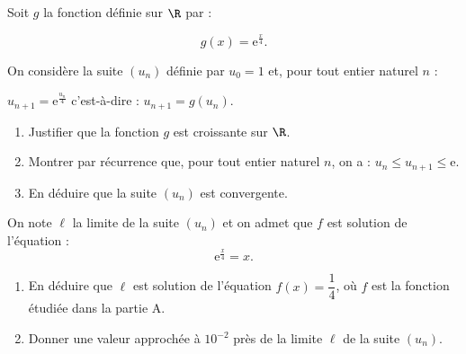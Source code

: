 Soit $g$ la fonction définie sur $\R$ par : 

\[g(x) = \text{e}^{\frac{x}{4}}.\]

On considère la suite $\left(u_n\right)$ définie par $u_0 = 1$ et, pour tout entier naturel $n$ :

$u_{n+1} = \text{e}^{\frac{u_n}{4}}$ c'est-à-dire : $u_{n+1} = g\left(u_n\right)$.

\medskip

\begin{enumerate}
\item Justifier que la fonction $g$ est croissante sur $\R$.
\item Montrer par récurrence que, pour tout entier naturel $n$, on a : $u_n \leqslant  u_{n+1} \leqslant \text{e}$.
\item En déduire que la suite $\left(u_n\right)$ est convergente.
\end{enumerate}

On note $\ell$ la limite de la suite $\left(u_n\right)$ et on admet que $f$ est solution de l'équation : 
\[\text{e}^{\frac{x}{4}} = x.\]

\begin{enumerate}[resume]
\item En déduire que $\ell$ est solution de l'équation $f(x) = \dfrac14$, où $f$ est la fonction étudiée dans
la partie A.
\item Donner une valeur approchée à $10^{-2}$ près de la limite $\ell$ de la suite $\left(u_n\right)$.
\end{enumerate}

\bigskip

